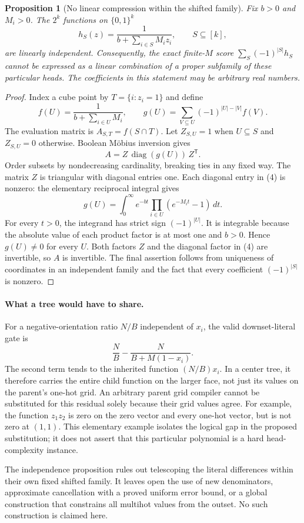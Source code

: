 \documentclass[11pt]{article}
\newtheorem{proposition}{Proposition}
\begin{document}
\begin{proposition}[No linear compression within the shifted family]
Fix $b>0$ and $M_i>0$. The $2^k$ functions on $\{0,1\}^k$
\[
 h_S(z)=\frac1{b+\sum_{i\in S}M_i z_i},
 \qquad S\subseteq[k],
 \tag{3}
\]
are linearly independent. Consequently, the exact finite-$M$ score
$\sum_S(-1)^{|S|}h_S$ cannot be expressed as a linear combination of a
proper subfamily of these particular heads. The coefficients in this
statement may be arbitrary real numbers.
\end{proposition}
\begin{proof}
Index a cube point by $T=\{i:z_i=1\}$ and define
\[
 f(U)=\frac1{b+\sum_{i\in U}M_i},
 \qquad
 g(U)=\sum_{V\subseteq U}(-1)^{|U|-|V|}f(V).
\]
The evaluation matrix is $A_{S,T}=f(S\cap T)$. Let
$Z_{S,U}=1$ when $U\subseteq S$ and $Z_{S,U}=0$ otherwise. Boolean
M\"obius inversion gives
\[
 A=Z\,\operatorname{diag}(g(U))\,Z^{\mathsf T}.
 \tag{4}
\]
Order subsets by nondecreasing cardinality, breaking ties in any fixed
way. The matrix $Z$ is triangular with diagonal entries one.
Each diagonal entry in (4) is nonzero: the elementary reciprocal
integral gives
\[
 g(U)=\int_0^\infty e^{-bt}
           \prod_{i\in U}(e^{-M_i t}-1)\,dt.
 \tag{5}
\]
For every $t>0$, the integrand has strict sign $(-1)^{|U|}$.
It is integrable because the absolute value of each product factor
is at most one and $b>0$. Hence $g(U)\ne0$ for every $U$.
Both factors $Z$ and the diagonal factor in (4) are invertible, so
$A$ is invertible. The final assertion follows from uniqueness of
coordinates in an independent family and the fact that every
coefficient $(-1)^{|S|}$ is nonzero.
\end{proof}

\paragraph{What a tree would have to share.}
For a negative-orientation ratio $N/B$ independent of $x_i$, the valid
downset-literal gate is
\[
 \frac{N}{B}-\frac{N}{B+M(1-x_i)}.
 \tag{6}
\]
The second term tends to the inherited function $(N/B)x_i$.
In a center tree, it therefore carries the entire child function on
the larger face, not just its values on the parent's one-hot grid.
An arbitrary parent grid compiler cannot be substituted for this
residual solely because their grid values agree. For example, the
function $z_1z_2$ is zero on the zero vector and every one-hot vector,
but is not zero at $(1,1)$. This elementary example isolates the
logical gap in the proposed substitution; it does not assert that
this particular polynomial is a hard head-complexity instance.

The independence proposition rules out telescoping the literal
differences within their own fixed shifted family. It leaves open
the use of new denominators, approximate cancellation with a proved
uniform error bound, or a global construction that constrains all
multihot values from the outset. No such construction is claimed here.
\end{document}
